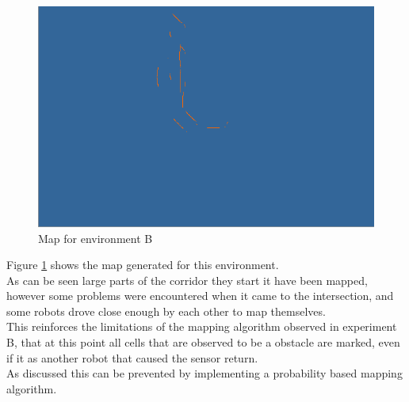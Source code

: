 \begin{figure}[h]
\centering
\includegraphics[scale=0.4]{Chapter4/images/experiment_2_map.png}
\caption{Map for environment B}
\label{fig:experiment_b_map}
\end{figure}

Figure \ref{fig:experiment_b_map} shows the map generated for this environment. \\
As can be seen large parts of the corridor they start it have been mapped, however some problems were encountered when it came to the intersection, and some robots drove close enough by each other to map themselves.\\
This reinforces the limitations of the mapping algorithm observed in experiment B, that at this point all cells that are observed to be a obstacle are marked, even if it as another robot that caused the sensor return. \\
As discussed this can be prevented by implementing a probability based mapping algorithm.\\
